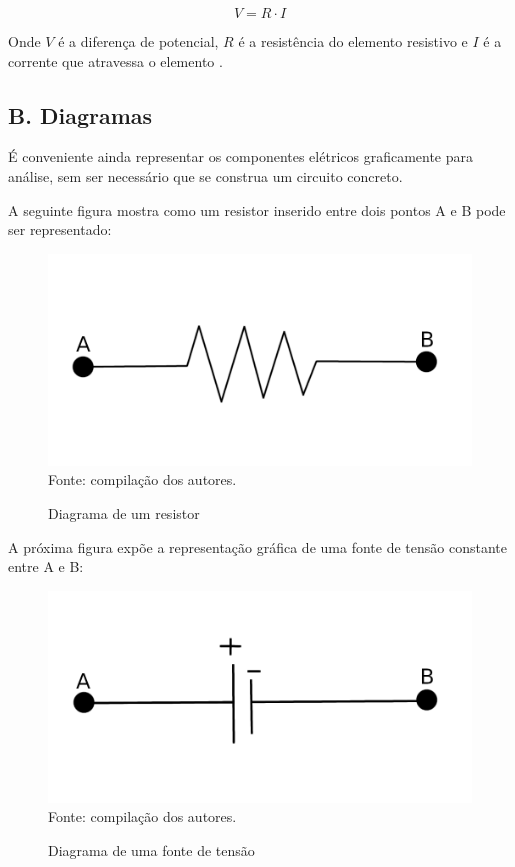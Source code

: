 \documentclass[twocolumn, 10pt]{extarticle}
\begin{document}
\[
V = R\cdot I
\]

Onde $V$ é a diferença de potencial, $R$ é a resistência do elemento resistivo e $I$ é a corrente que atravessa o elemento \cite[p. 28]{sadiku}.

\subsection*{B. \quad Diagramas}

É conveniente ainda representar os componentes elétricos graficamente para análise, sem ser necessário que se construa um circuito concreto.

A seguinte figura mostra como um resistor inserido entre dois pontos A e B pode ser representado:

\begin{figure}[H]
	\caption{Diagrama de um resistor} 
	\centering
	\includegraphics[scale=0.7]{res1}
	\\ Fonte: compilação dos autores.
\end{figure}

A próxima figura expõe a representação gráfica de uma fonte de tensão constante entre A e B:

\begin{figure}[H]
	\caption{Diagrama de uma fonte de tensão} 
	\centering
	\includegraphics[scale=0.7]{vcc1}
	\\ Fonte: compilação dos autores.
\end{figure}
\end{document}
